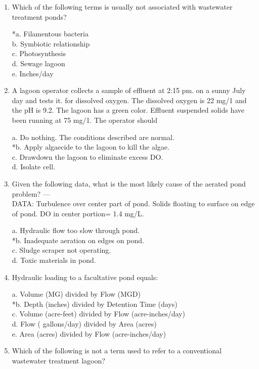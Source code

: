 \begin{enumerate}
\item  Which of the following terms is usually not associated with wastewater treatment ponds? 

*a. Filamentous bacteria \\
b. Symbiotic relationship \\
c. Photosynthesis \\
d. Sewage lagoon \\
e. Inches/day \\


\item  A lagoon operator collects a sample of effluent at 2:15 pm. on a sunny July day and tests it. for dissolved oxygen. The dissolved oxygen is 22 mg/1 and the pH is 9.2. The lagoon has a green color. Effluent suspended solids have been running at 75 mg/1. The operator should 

a. Do nothing. The conditions described are normal. \\
*b. Apply algaecide to the lagoon to kill the algae. \\
c. Drawdown the lagoon to eliminate excess DO. \\
d. Isolate cell. 

\item  Given the following data, what is the most likely cause of the aerated pond problem? ---\\
DATA: Turbulence over center part of pond. Solids floating to surface on edge of pond. DO in center portion= 1.4 mg/L. 

a. Hydraulic flow too slow through pond. \\
*b. Inadequate aeration on edges on pond. \\
c. Sludge scraper not operating. \\
d. Toxic materials in pond. 


\item  Hydraulic loading to a facultative pond equals: 

a. Volume (MG) divided by Flow (MGD) \\
*b. Depth (inches) divided by Detention Time (days) \\
c. Volume (acre-feet) divided by Flow (acre-inches/day) \\
d. Flow ( gallons/day) divided by Area (acres) \\
e. Area (acres) divided by Flow (acre-inches/day) 


\item  Which of the following is not a term used to refer to a conventional wastewater treatment lagoon? 


\end{enumerate}
